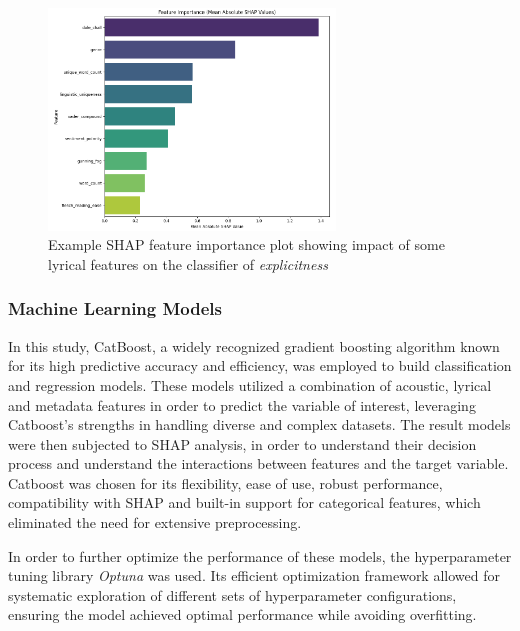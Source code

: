 \begin{center}
\begin{figure}[ht]
  \centering
  \includegraphics[width=3in]{img/shap_feature_importance.png}
  \caption{Example SHAP feature importance plot showing impact of some lyrical features
  on the classifier of \textit{explicitness}}
  \label{Figure:fig_beh}
\end{figure}
\end{center}

\subsubsection*{Machine Learning Models}
In this study, CatBoost, a widely recognized gradient boosting algorithm known
for its high predictive accuracy and efficiency, was employed to build
classification and regression models. These models utilized a combination of
acoustic, lyrical and metadata features in order to predict the variable of
interest, leveraging Catboost's strengths in handling diverse and complex
datasets. The result models were then subjected to SHAP analysis, in order to
understand their decision process and understand the interactions between
features and the target variable. Catboost was chosen for its flexibility, ease
of use, robust performance, compatibility with SHAP and built-in support for
categorical features,  which eliminated the need for extensive preprocessing.

In order to further optimize the performance of these models, the
hyperparameter tuning library \textit{Optuna} was used. Its efficient
optimization framework allowed for systematic exploration of different sets of
hyperparameter configurations, ensuring the model achieved optimal performance while avoiding
overfitting. 

